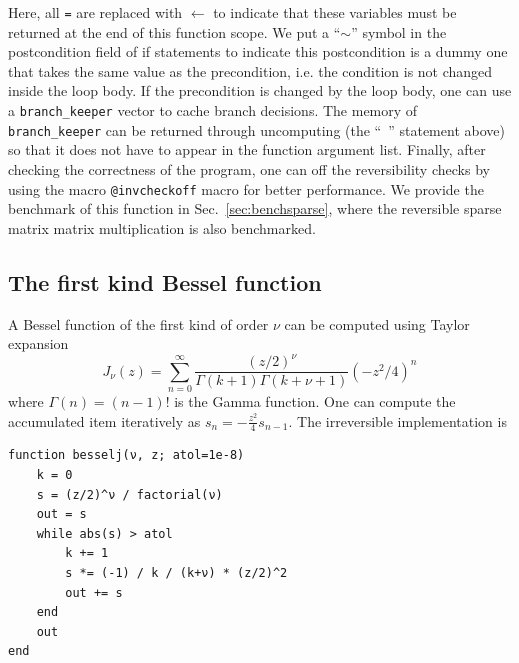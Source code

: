 \documentclass{article}
\newcommand{\<}{\langle}
\renewcommand{\>}{\rangle}
\newcommand{\Sec}[1]{Sec.~\ref{#1}}
\theoremstyle{definition}\newtheorem{definition}{\textit{Definition}}
\begin{document}
Here, all \texttt{=} are replaced with \texttt{$\leftarrow$} to indicate that these variables must be returned at the end of this function scope.
We put a ``\texttt{$\sim$}'' symbol in the postcondition field of if statements to indicate this postcondition is a dummy one that takes the same value as the precondition, i.e. the condition is not changed inside the loop body.
If the precondition is changed by the loop body, one can use a \texttt{branch\_keeper} vector to cache branch decisions. The memory of \texttt{branch\_keeper} can be returned through uncomputing (the ``~'' statement above) so that it does not have to appear in the function argument list.
Finally, after checking the correctness of the program, one can off the reversibility checks by using the macro \texttt{@invcheckoff} macro for better performance. We provide the benchmark of this function in \Sec{sec:benchsparse}, where the reversible sparse matrix matrix multiplication is also benchmarked.

\subsection{The first kind Bessel function}\label{sec:bessel}
A Bessel function of the first kind of order $\nu$ can be computed using Taylor expansion
\begin{equation}
    J_\nu(z) = \sum\limits_{n=0}^{\infty} \frac{(z/2)^\nu}{\Gamma(k+1)\Gamma(k+\nu+1)} (-z^2/4)^{n}
\end{equation}
where $\Gamma(n) = (n-1)!$ is the Gamma function. One can compute the accumulated item iteratively as $s_n = -\frac{z^2}{4} s_{n-1}$. The irreversible implementation is

\begin{minipage}{.88\columnwidth}
\begin{lstlisting}
function besselj(ν, z; atol=1e-8)
    k = 0
    s = (z/2)^ν / factorial(ν)
    out = s
    while abs(s) > atol
        k += 1
        s *= (-1) / k / (k+ν) * (z/2)^2
        out += s
    end
    out
end
\end{lstlisting}
\end{minipage}
\end{document}

